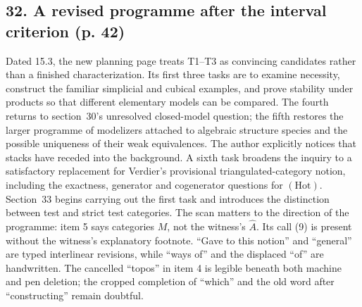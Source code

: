 \documentclass[10pt,oneside]{book}
\begin{document}
\subsection*{32. A revised programme after the interval criterion (p. 42)}
Dated 15.3, the new planning page treats T1--T3 as convincing candidates rather than a finished characterization. Its first three tasks are to examine necessity, construct the familiar simplicial and cubical examples, and prove stability under products so that different elementary models can be compared. The fourth returns to section~30's unresolved closed-model question; the fifth restores the larger programme of modelizers attached to algebraic structure species and the possible uniqueness of their weak equivalences. The author explicitly notices that stacks have receded into the background. A sixth task broadens the inquiry to a satisfactory replacement for Verdier's provisional triangulated-category notion, including the exactness, generator and cogenerator questions for $(\mathrm{Hot})$. Section~33 begins carrying out the first task and introduces the distinction between test and strict test categories. The scan matters to the direction of the programme: item 5 says categories $M$, not the witness's $\widehat A$. Its call (9) is present without the witness's explanatory footnote. ``Gave to this notion'' and ``general'' are typed interlinear revisions, while ``ways of'' and the displaced ``of'' are handwritten. The cancelled ``topos'' in item 4 is legible beneath both machine and pen deletion; the cropped completion of ``which'' and the old word after ``constructing'' remain doubtful.
\end{document}
